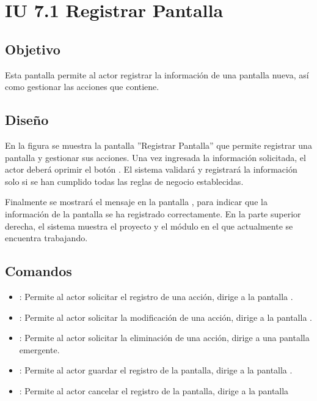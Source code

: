 \section{IU 7.1 Registrar Pantalla}

\subsection{Objetivo}
	Esta pantalla permite al actor registrar la información de una pantalla nueva, así como gestionar las acciones que contiene.
\subsection{Diseño}
	En la figura  se muestra la pantalla ''Registrar Pantalla'' que permite registrar una pantalla y gestionar sus acciones.
	Una vez ingresada la información solicitada, el actor deberá oprimir el botón  . El sistema validará y registrará la información solo si se han cumplido todas las reglas de negocio establecidas.
	
	Finalmente se mostrará el mensaje  en la pantalla , para indicar que la información de la pantalla se ha registrado correctamente.
	En la parte superior derecha, el sistema muestra el proyecto y el módulo en el que actualmente se encuentra trabajando.

\subsection{Comandos}
\begin{itemize}
	\item {}: Permite al actor solicitar el registro de una acción, dirige a la pantalla .
	\item \editar [Modificar]: Permite al actor solicitar la modificación de una acción, dirige a la pantalla .
	\item \eliminar [Eliminar]: Permite al actor solicitar la eliminación de una acción, dirige a una pantalla emergente.
	\item {}: Permite al actor guardar el registro de la pantalla, dirige a la pantalla .
	\item {}: Permite al actor cancelar el registro de la pantalla, dirige a la pantalla 
\end{itemize}

